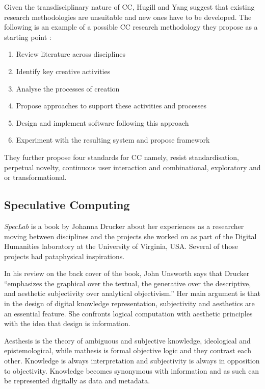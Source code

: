 Given the transdisciplinary nature of \ac{CC}, Hugill and Yang suggest that existing research methodologies are unsuitable and new ones have to be developed. The following is an example of a possible \ac{CC} research methodology they propose as a starting point \autocite[p.17]{Hugill2013c}:

\begin{enumerate}
  \item Review literature across disciplines
  \item Identify key creative activities
  \item Analyse the processes of creation
  \item Propose approaches to support these activities and processes
  \item Design and implement software following this approach
  \item Experiment with the resulting system and propose framework
\end{enumerate}

They further propose four standards for \ac{CC} \citeyear[p.17]{Hugill2013c} namely, resist standardisation, perpetual novelty, continuous user interaction and combinational, exploratory and or transformational.


\subsection{Speculative Computing}
\label{s:speccomp}

\textit{SpecLab} is a book by Johanna Drucker \citeyear{Drucker2009} about her experiences as a researcher moving between disciplines and the projects she worked on as part of the Digital Humanities laboratory at the University of Virginia, USA\@. Several of those projects had pataphysical inspirations.

In his review on the back cover of the book, John Unsworth says that Drucker ``emphasizes the graphical over the textual, the generative over the descriptive, and aesthetic subjectivity over analytical objectivism.'' Her main argument is that in the design of digital knowledge representation, subjectivity and aesthetics are an essential feature. She confronts logical computation with aesthetic principles with the idea that design is information.

Aesthesis is the theory of ambiguous and subjective knowledge, ideological and epistemological, while mathesis is formal objective logic and they contrast each other. Knowledge is always interpretation and subjectivity is always in opposition to objectivity. Knowledge becomes synonymous with information and as such can be represented digitally as data and metadata.


